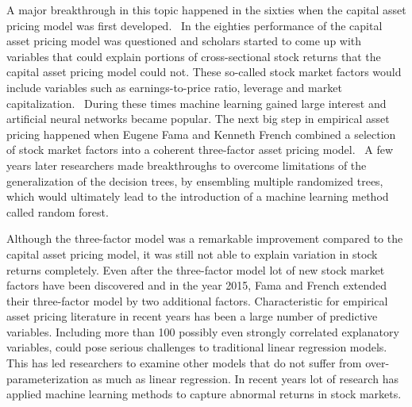 \documentclass[12pt]{article}
\begin{document}
A major breakthrough in this topic happened in the sixties when the capital asset pricing model was first developed.\footnotemark {} \ In the eighties performance of the capital asset pricing model was questioned and scholars started to come up with variables that could explain portions of cross-sectional stock returns that the capital asset pricing model could not. These so-called stock market factors would include variables such as earnings-to-price ratio, leverage and market capitalization.\footnotemark  {} \ During these times machine learning gained large interest and artificial neural networks became popular. The next big step in empirical asset pricing happened when Eugene Fama and Kenneth French combined a selection of stock market factors into a coherent three-factor asset pricing model. \footnotemark {} \ A few years later researchers made breakthroughs to overcome limitations of the generalization of the decision trees, by ensembling multiple randomized trees, which would ultimately lead to the introduction of a machine learning method called random forest.\footnotemark {} \par

Although the three-factor model was a remarkable improvement compared to the capital asset pricing model, it was still not able to explain variation in stock returns completely. Even after the three-factor model lot of new stock market factors have been discovered and in the year 2015, Fama and French extended their three-factor model by two additional factors.\footnotemark {} Characteristic for empirical asset pricing literature in recent years has been a large number of predictive variables. Including more than 100 possibly even strongly correlated explanatory variables, could pose serious challenges to traditional linear regression models. This has led researchers to examine other models that do not suffer from over-parameterization as much as linear regression. In recent years lot of research has applied machine learning methods to capture abnormal returns in stock markets.  \par
\end{document}

